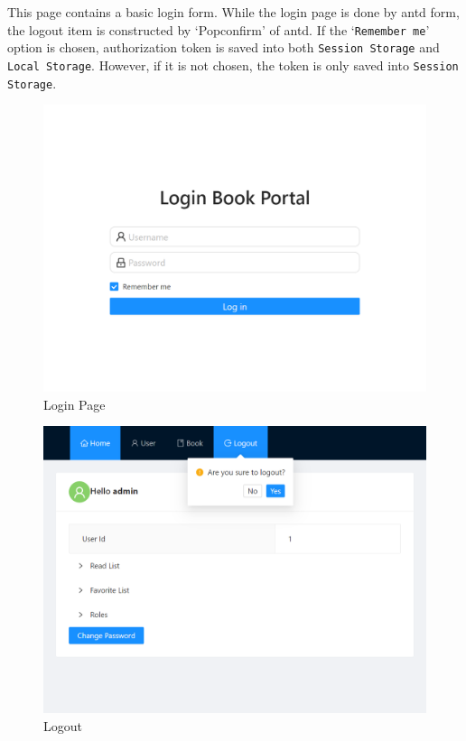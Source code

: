 This page contains a basic login form. While the login page is done by antd form, the logout item is constructed by `Popconfirm' of antd. If the `\texttt{Remember me}' option is chosen, authorization token is saved into both \texttt{Session Storage} and \texttt{Local Storage}. However, if it is not chosen, the token is only saved into \texttt{Session Storage}.

\begin{minipage}{.49\textwidth}
  \begin{figure}[H]
    \centering
  \includegraphics[width=\textwidth]{img/front-end/login-page.png}
  \caption{Login Page}
  \end{figure}
\end{minipage}
\begin{minipage}{.49\textwidth}
  \begin{figure}[H]
    \centering
  \includegraphics[width=\textwidth]{img/front-end/logout.png}
  \caption{Logout}
  \end{figure}
\end{minipage}

